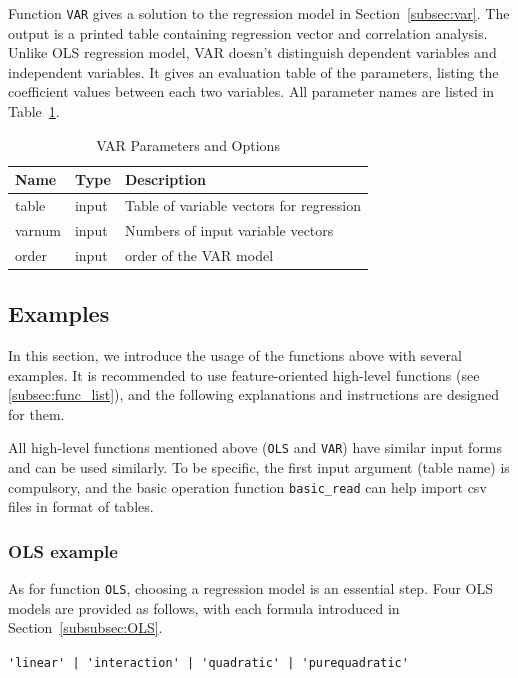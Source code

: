 \documentclass[10pt]{article}
\numberwithin{equation}{section}
\numberwithin{table}{section}
\numberwithin{figure}{section}
\begin{document}
Function \verb!VAR! gives a solution to the regression model in Section~\ref{subsec:var}. The output is a printed table containing regression vector and correlation analysis. Unlike OLS regression model, VAR doesn't distinguish dependent variables and independent variables. It gives an evaluation table of the parameters, listing the coefficient values between each two variables. All parameter names are listed in Table~\ref{tab:OLS}.

\begin{table}[!ht]
  \centering
  \begin{threeparttable}
    \caption{VAR Parameters and Options}
    \label{tab:OLS}
    \footnotesize
    \begin{tabular}{lp{}p{}}
      \toprule
      Name & Type & Description \\
      \midrule
     table & input & Table of variable vectors for regression\\
      \midrule
     varnum & input & Numbers of input variable vectors\\
      \midrule
     order & input & order of the VAR model\\                   
      \bottomrule
    \end{tabular}
  \end{threeparttable}
\end{table}

\subsection{Examples}\label{subsec:examples}

In this section, we introduce the usage of the functions above with several examples. It is recommended to use feature-oriented high-level functions (see \ref{subsec:func_list}), and the following explanations and instructions are designed for them.

All high-level functions mentioned above (\verb!OLS! and \verb!VAR!) have similar input forms and can be used similarly. To be specific, the first input argument (table name) is compulsory, and the basic operation function \verb!basic_read! can help import csv files in format of tables. 

\subsubsection{OLS example}\label{subsec:ols example}

As for function \verb!OLS!, choosing a regression model is an essential step. Four OLS models are provided as follows, with each formula introduced in Section~\ref{subsubsec:OLS}.
\begin{center}
  \verb!'linear' | 'interaction' | 'quadratic' | 'purequadratic'!
\end{center}
\end{document}
